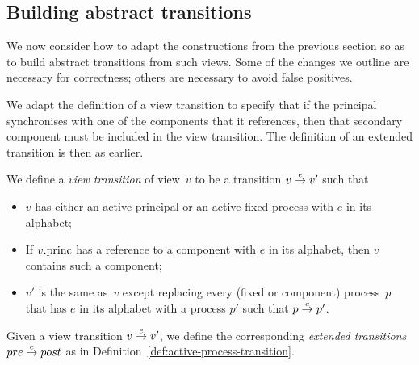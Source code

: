 
\subsection{Building abstract transitions}

We now consider how to adapt the constructions from the previous section so as
to build abstract transitions from such views.  Some of the changes we outline
are necessary for correctness; others are necessary to avoid false positives.



We adapt the definition of a view transition to specify that if the principal
synchronises with one of the components that it references, then that
secondary component must be included in the view transition.  The definition
of an extended transition is then as earlier. 
%
\begin{definition}
We define a \emph{view transition} of view~$v$ to be a transition $v \stackrel{e}\rightarrow
v'$ such that
%
\begin{itemize}
\item $v$ has either an active principal or an active fixed process with $e$
  in its alphabet;

\item If $v.\mathrm{princ}$ has a reference to a component with $e$ in its alphabet,
  then $v$ contains such a component;

\item $v'$ is the same as~$v$ except replacing every (fixed or component)
  process~$p$ that has $e$ in its alphabet with a process $p'$ such that \( p
  \stackrel{e}\rightarrow p' \).
\end{itemize}

Given a view transition $v \stackrel{e}\rightarrow v'$, we define the corresponding
\emph{extended transitions} $pre \stackrel{e}\rightarrow post$ as in
Definition~\ref{def:active-process-transition}.
\end{definition}

